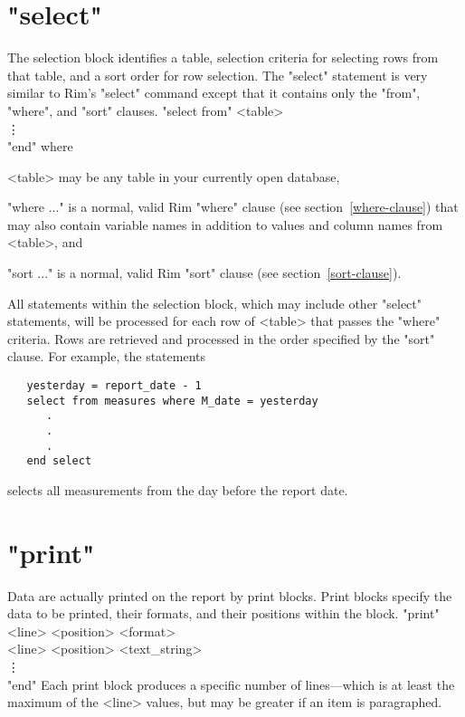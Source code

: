  
\section{"select"}
%
The selection block identifies a table, selection criteria for
selecting rows from that table, and a sort order for row selection.
The "select" statement is very similar to Rim's "select" command
except that it contains only the "from", "where", and "sort" clauses.
\<"select from" <table> 
   \\
  \quad\vdots\\"end" \>
where
\begin{List}
\item[<table>] may be any table in your currently open database,
\item["where ..."] is a normal, valid Rim "where" clause
(see section~\ref{where-clause}) that may also contain variable
names in addition to values and column names from <table>, and
\item["sort ..."] is a normal, valid Rim "sort" clause
(see section~\ref{sort-clause}).
\end{List}
 
All statements within the selection block,
which may include other "select" statements,
will be processed for each row of <table>
that passes the "where" criteria.  Rows are retrieved
and processed in the order specified by the "sort" clause.
For example, the statements
 
\begin{verbatim}
   yesterday = report_date - 1
   select from measures where M_date = yesterday
      .
      .
      .
   end select
\end{verbatim}
 
selects all measurements from the day before the report date.
 
 
\section{"print"}
%
Data are actually printed on the report by print blocks.
Print blocks specify the data to be printed, their formats,
and their positions within the block.
\<"print"\\
  <line> <position>  <format>\\
  <line> <position> <text_string>\\
    \vdots\\
  "end" \>
Each print block produces a specific number of lines---which is at least
the maximum of the <line> values, but may be greater if an item is paragraphed.
 
